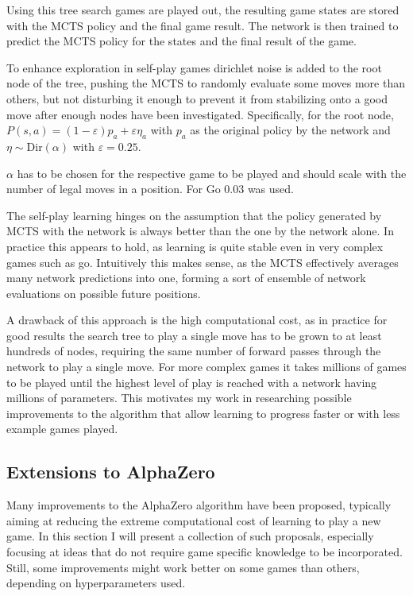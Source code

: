 \documentclass[12pt,onecolumn,oneside,titlepage]{article}
\begin{document}
Using this tree search games are played out, the resulting game states are stored with the MCTS policy and the final game result. The network is then trained to predict the MCTS policy for the states and the final result of the game.

To enhance exploration in self-play games dirichlet noise is added to the root node of the tree, pushing the MCTS to randomly evaluate some moves more than others, but not disturbing it enough to prevent it from stabilizing onto a good move after enough nodes have been investigated.
Specifically, for the root node, $P(s, a) = (1 - \varepsilon)p_a+ \varepsilon \eta_a$ with $p_a$ as the original policy by the network and $\eta \sim \text{Dir}(\alpha)$ with $\varepsilon = 0.25$.

$\alpha$ has to be chosen for the respective game to be played
and should scale with the number of legal moves in a position. For Go $0.03$ was used.

The self-play learning hinges on the assumption that the policy generated by MCTS with the network is always better than the one by the network alone. In practice this appears to hold, as learning is quite stable even in very complex games such as go. Intuitively this makes sense,
as the MCTS effectively averages many network predictions into one, forming a sort of ensemble of network evaluations on possible future positions.

A drawback of this approach is the high computational cost, as in practice for good results the search tree to play a single move has to be grown to at least hundreds of nodes, requiring the same number of forward passes through the network to play a single move.
For more complex games it takes millions of games to be played until the highest level of play is reached with a network having millions of parameters. This motivates my work in researching possible improvements to the algorithm that allow learning to progress
faster or with less example games played.

\subsection{Extensions to AlphaZero} \label{s:prev_extensions}

Many improvements to the AlphaZero algorithm have been proposed, typically aiming at reducing the extreme computational cost of learning to play a new game.
In this section I will present a collection of such proposals, especially focusing at ideas that do not require game specific knowledge to be incorporated. Still, some improvements might work better on some games than others,
depending on hyperparameters used. 
\end{document}
